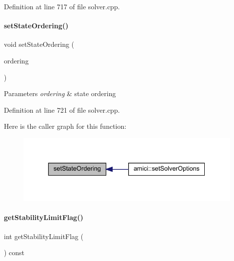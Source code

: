 Definition at line 717 of file solver.\+cpp.

\mbox{\label{classamici_1_1_solver_aa22ae4579c350a6f3fae2e3b5a0da1de}} 
\paragraph{\texorpdfstring{set\+State\+Ordering()}{setStateOrdering()}}
{\footnotesize\ttfamily void set\+State\+Ordering (\begin{DoxyParamCaption}\item[{\mbox{\hyperlink{namespaceamici_a890d968060d6d830aeed98dbeb04447f}{State\+Ordering}}}]{ordering }\end{DoxyParamCaption})}


\begin{DoxyParams}{Parameters}
{\em ordering} & state ordering \\
\hline
\end{DoxyParams}


Definition at line 721 of file solver.\+cpp.

Here is the caller graph for this function\+:
\nopagebreak
\begin{figure}[H]
\begin{center}
\leavevmode
\includegraphics[width=329pt]{classamici_1_1_solver_aa22ae4579c350a6f3fae2e3b5a0da1de_icgraph}
\end{center}
\end{figure}
\mbox{\label{classamici_1_1_solver_ae1e9c3c5e59413ae25fb67c29983e3f3}} 
\paragraph{\texorpdfstring{get\+Stability\+Limit\+Flag()}{getStabilityLimitFlag()}}
{\footnotesize\ttfamily int get\+Stability\+Limit\+Flag (\begin{DoxyParamCaption}{ }\end{DoxyParamCaption}) const}

